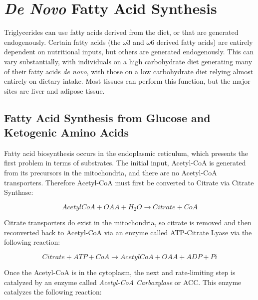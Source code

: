 \documentclass{tufte-handout}
\begin{document}
\section{\textit{De Novo} Fatty Acid Synthesis}

Triglycerides can use fatty acids derived from the diet, or that are generated endogenously.  Certain fatty acids (the $\omega$3 and $\omega$6 derived fatty acids) are entirely dependent on nutritional inputs, but others are generated endogenously.  This can vary substantially, with individuals on a high carbohydrate diet generating many of their fatty acids \textit{de novo}, with those on a low carbohydrate diet relying almost entirely on dietary intake.  Most tissues can perform this function, but the major sites are liver and adipose tissue.

\subsection{Fatty Acid Synthesis from Glucose and Ketogenic Amino Acids}

Fatty acid biosynthesis occurs in the endoplasmic reticulum, which presents the first problem in terms of substrates.  The initial input, Acetyl-CoA is generated from its precursors in the mitochondria, and there are no Acetyl-CoA transporters.  Therefore Acetyl-CoA must first be converted to Citrate via Citrate Synthase:

\begin{equation}\label{eq:acl}
AcetylCoA + OAA + H_2O \rightarrow Citrate + CoA
\end{equation}

Citrate transporters do exist in the mitochondria, so citrate is removed and then reconverted back to Acetyl-CoA via an enzyme called ATP-Citrate Lyase via the following reaction:

\begin{equation}\label{eq:acl}
Citrate + ATP + CoA \rightarrow AcetylCoA + OAA + ADP + Pi
\end{equation}

Once the Acetyl-CoA is in the cytoplasm, the next and rate-limiting step is catalyzed by an enzyme called \emph{Acetyl-CoA Carboxylase} or ACC.  This enzyme catalyzes the following reaction:
\end{document}
